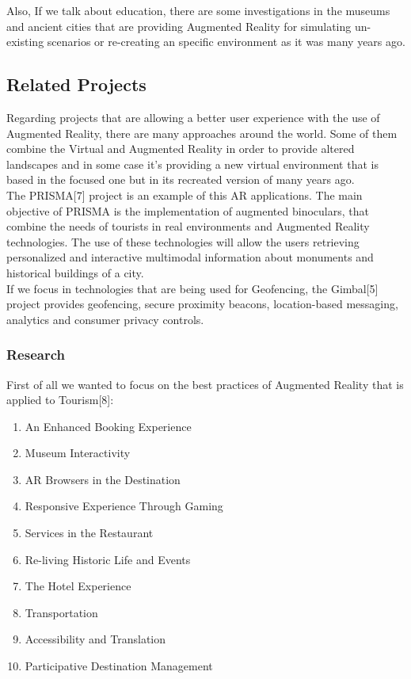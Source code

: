 Also, If we talk about education, there are some investigations in the museums and 
ancient cities that are providing Augmented Reality for simulating un-existing scenarios
or re-creating an specific environment as it was many years ago.\\


\subsection{Related Projects}
Regarding projects that are allowing a better user experience with the use of Augmented Reality, there are many 
approaches around the world. Some of them combine the Virtual and Augmented Reality in order to provide altered
landscapes and in some case it's providing a new virtual environment that is based in the focused one but in its 
recreated version of many years ago. \\

The PRISMA[7] project is an example of this AR applications. 
The main objective of PRISMA is the implementation of augmented binoculars, that combine the needs of tourists
in real environments and Augmented Reality technologies. The use of these technologies will allow the users retrieving
personalized and interactive multimodal information about monuments and historical buildings of a city. \\

If we focus in technologies that are being used for Geofencing, the Gimbal[5] project  provides geofencing, secure 
proximity beacons, location-based messaging, analytics and consumer privacy controls. 

\subsubsection{Research}
First of all we wanted to focus on the best practices of Augmented Reality that is applied to Tourism[8]:

\begin{enumerate}
  \item An Enhanced Booking Experience
  \item Museum Interactivity
  \item AR Browsers in the Destination
  \item Responsive Experience Through Gaming
  \item Services in the Restaurant
  \item Re-living Historic Life and Events
  \item The Hotel Experience
  \item Transportation
  \item Accessibility and Translation
  \item Participative Destination Management
\end{enumerate}

